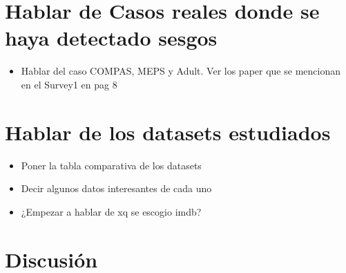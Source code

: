 \section{Hablar de Casos reales donde se haya detectado sesgos}

    \begin{itemize}
        \item Hablar del caso COMPAS, MEPS y Adult. Ver los paper que se mencionan en el Survey1 en pag 8
    \end{itemize}

\section{Hablar de los datasets estudiados}
    \begin{itemize}
        \item Poner la tabla comparativa de los datasets
        \item Decir algunos datos interesantes de cada uno
        \item ¿Empezar a hablar de xq se escogio imdb?
    \end{itemize}

\section{Discusi\'on}

